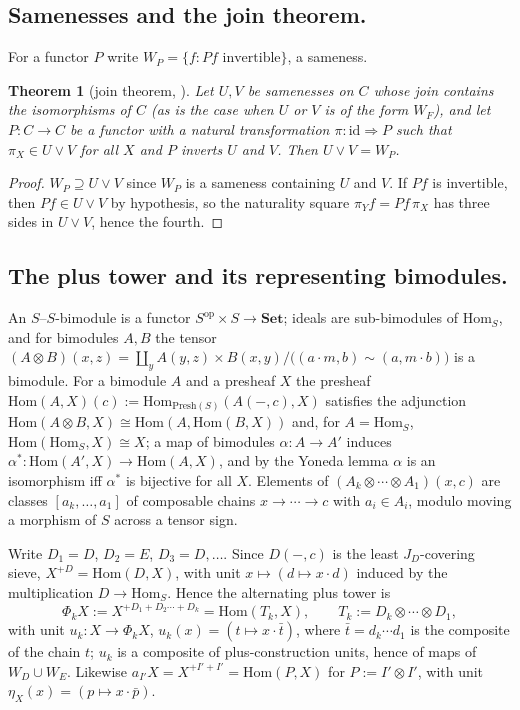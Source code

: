 \documentclass[11pt]{amsart}
\newtheorem{thm}{Theorem}[section]
\theoremstyle{definition}
\newcommand{\Presh}{\mathrm{Presh}}
\newcommand{\Hom}{\mathrm{Hom}}
\begin{document}
\subsection{Samenesses and the join theorem.}
For a functor $P$ write $W_P=\{f:Pf\text{ invertible}\}$, a sameness.

\begin{thm}[join theorem, {\cite[Thm.~4.1]{Postnikov}}]\label{thm:join}
Let $U,V$ be samenesses on $C$ whose join contains the isomorphisms of $C$
(as is the case when $U$ or $V$ is of the form $W_F$), and let $P\colon C\to C$
be a functor with a natural transformation $\pi\colon\mathrm{id}\Rightarrow P$
such that $\pi_X\in U\vee V$ for all $X$ and $P$ inverts $U$ and $V$. Then
$U\vee V=W_P$.
\end{thm}
\begin{proof}
$W_P\supseteq U\vee V$ since $W_P$ is a sameness containing $U$ and $V$. If
$Pf$ is invertible, then $Pf\in U\vee V$ by hypothesis, so the naturality
square $\pi_Y f=Pf\,\pi_X$ has three sides in $U\vee V$, hence the fourth.
\end{proof}

\subsection{The plus tower and its representing bimodules.}\label{sub:tower}
An $S$--$S$-bimodule is a functor $S^{\mathrm{op}}\times S\to\mathbf{Set}$; ideals
are sub-bimodules of $\Hom_S$, and for bimodules $A,B$ the tensor
$(A\otimes B)(x,z)=\coprod_yA(y,z)\times B(x,y)/\bigl((a\cdot m,b)\sim(a,m\cdot b)\bigr)$
is a bimodule. For a bimodule $A$ and a presheaf $X$ the presheaf
$\Hom(A,X)(c):=\Hom_{\Presh(S)}(A(-,c),X)$ satisfies the adjunction
$\Hom(A\otimes B,X)\cong\Hom(A,\Hom(B,X))$ and, for $A=\Hom_S$, $\Hom(\Hom_S,X)\cong X$;
a map of bimodules $\alpha\colon A\to A'$ induces $\alpha^*\colon\Hom(A',X)\to\Hom(A,X)$,
and by the Yoneda lemma $\alpha$ is an isomorphism iff $\alpha^*$ is bijective
for all $X$. Elements of $(A_k\otimes\cdots\otimes A_1)(x,c)$ are classes
$[a_k,\dots,a_1]$ of composable chains $x\to\cdots\to c$ with $a_i\in A_i$,
modulo moving a morphism of $S$ across a tensor sign.

Write $D_1=D$, $D_2=E$, $D_3=D,\dots$. Since $D(-,c)$ is the least
$J_D$-covering sieve, $X^{+D}=\Hom(D,X)$, with unit $x\mapsto(d\mapsto x\cdot d)$
induced by the multiplication $D\to\Hom_S$. Hence the alternating plus tower is
\[
\Phi_kX:=X^{+D_1+D_2\cdots+D_k}=\Hom(T_k,X),\qquad T_k:=D_k\otimes\cdots\otimes D_1,
\]
with unit $u_k\colon X\to\Phi_kX$, $u_k(x)=(t\mapsto x\cdot\bar t)$, where
$\bar t=d_k\cdots d_1$ is the composite of the chain $t$; $u_k$ is a composite
of plus-construction units, hence of maps of $W_D\cup W_E$. Likewise
$a_{I'}X=X^{+I'+I'}=\Hom(P,X)$ for $P:=I'\otimes I'$, with unit
$\eta_X(x)=(p\mapsto x\cdot\bar p)$.
\end{document}

